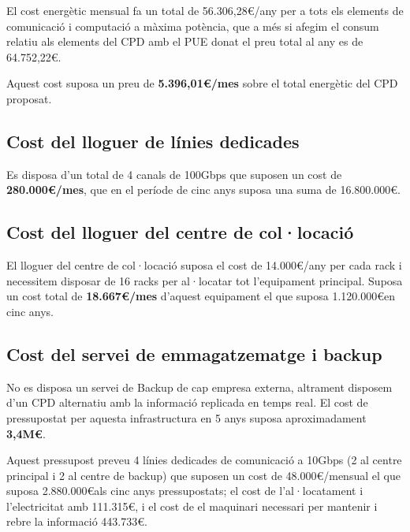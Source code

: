 El cost energètic mensual fa un total de 56.306,28\euro/any per a tots els elements de comunicació i computació a màxima potència, que a més si afegim el consum relatiu als elements del CPD amb el PUE donat el preu total al any es de 64.752,22\euro. 

Aquest cost suposa un preu de \textbf{5.396,01\euro/mes} sobre el total energètic del CPD proposat.

\subsection{Cost del lloguer de línies dedicades}

Es disposa d'un total de 4 canals de 100Gbps que suposen un cost de \textbf{280.000\euro/mes}, que en el període de cinc anys suposa una suma de 16.800.000\euro.

\subsection{Cost del lloguer del centre de col·locació}

El lloguer del centre de col·locació suposa el cost de 14.000\euro/any per cada rack i necessitem disposar de 16 racks per al·locatar tot l'equipament principal. Suposa un cost total de \textbf{18.667\euro/mes} d'aquest equipament el que suposa 1.120.000\euro en cinc anys.

\subsection{Cost del servei de emmagatzematge i backup}

No es disposa un servei de Backup de cap empresa externa, altrament disposem d'un CPD alternatiu amb la informació replicada en temps real. El cost de pressupostat per aquesta infrastructura en 5 anys suposa aproximadament \textbf{3,4M\euro}.

Aquest pressupost preveu 4 línies dedicades de comunicació a 10Gbps (2 al centre principal i 2 al centre de backup) que suposen un cost de 48.000\euro/mensual el que suposa 2.880.000\euro als cinc anys pressupostats; el cost de l'al·locatament i l'electricitat amb 111.315\euro, i el cost de el maquinari necessari per mantenir i rebre la informació 443.733\euro.